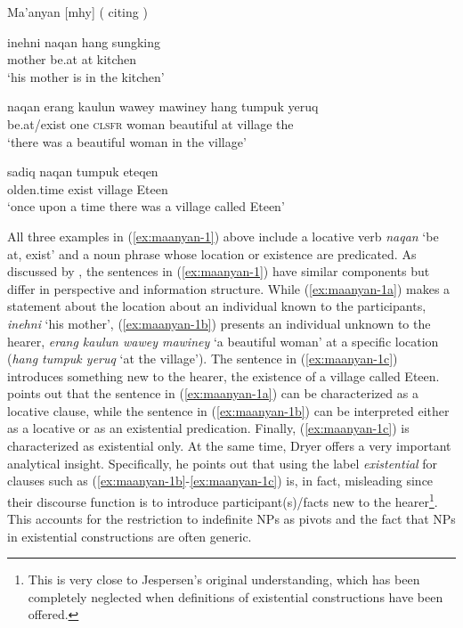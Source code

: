 \documentclass[output=paper,chinesefont,colorlinks,citecolor=brown]{langscibook}
\begin{document}
\begin{exe} \ex Ma’anyan [mhy] (\citealt[240--241]{dryer2007a} citing \citealt{gudai1988})\label{ex:maanyan-1}
\begin{xlist}
\ex \label{ex:maanyan-1a}
\gll inehni naqan hang sungking\\
mother be.at at kitchen\\
\glt ‘his mother is in the kitchen’

\ex \label{ex:maanyan-1b}
\gll naqan erang kaulun wawey mawiney hang tumpuk yeruq\\
be.at/exist one \textsc{clsfr} woman beautiful at village the\\
\glt ‘there was a beautiful woman in the village’

\ex \label{ex:maanyan-1c}
\gll sadiq naqan tumpuk eteqen\\
olden.time exist village Eteen\\
\glt ‘once upon a time there was a village called Eteen’
\end{xlist}

\end{exe}
All three examples in (\ref{ex:maanyan-1}) above include a locative verb \textit{naqan} ‘be at, exist’ and a noun phrase whose location or existence are predicated. As discussed by \citet{dryer2007a}, the sentences in (\ref{ex:maanyan-1}) have similar components but differ in perspective and information structure. While (\ref{ex:maanyan-1a}) makes a statement about the location about an individual known to the participants, \textit{inehni} ‘his mother’, (\ref{ex:maanyan-1b}) presents an individual unknown to the hearer, \textit{erang kaulun wawey mawiney} ‘a beautiful woman’ at a specific location (\textit{hang tumpuk yeruq} ‘at the village’). The sentence in (\ref{ex:maanyan-1c}) introduces something new to the hearer, the existence of a village called Eteen. \citet[241]{dryer2007a} points out that the sentence in (\ref{ex:maanyan-1a}) can be characterized as a locative clause, while the sentence in (\ref{ex:maanyan-1b}) can be interpreted either as a locative or as an existential predication. Finally, (\ref{ex:maanyan-1c}) is characterized as existential only. At the same time, Dryer offers a very important analytical insight. Specifically, he points out that using the label \textit{existential} for clauses such as (\ref{ex:maanyan-1b}-\ref{ex:maanyan-1c}) is, in fact, misleading since their discourse function is to introduce participant(s)/facts new to the hearer\footnote{This is very close to Jespersen’s original understanding, which has been completely neglected when definitions of existential constructions have been offered.}. This accounts for the restriction to indefinite NPs as pivots and the fact that NPs in existential constructions are often generic.
\end{document}

